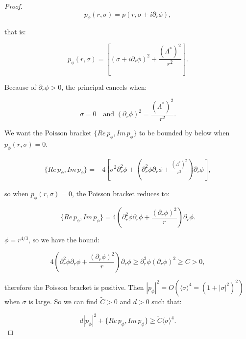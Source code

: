 \documentclass[leqno,11pt,letterpaper, english]{amsart}
\theoremstyle{plain}
\theoremstyle{definition}
\numberwithin{equation}{section}
\begin{document}
\begin{proof}
		\begin{equation}
			p_{\phi}(r,\sigma)=p(r,\sigma +i\partial_r \phi),
		\end{equation}
		
		that is:
		
		\begin{equation}
			p_{\phi}(r,\sigma)= \left[(\sigma+i\partial_r\phi)^2+\frac{(\Lambda^*)^2}{r^2}\right].
		\end{equation} 
		
		Because of $\partial_r\phi>0$, the principal cancels when: 
		
		\begin{equation}
			 \sigma=0 \quad \mbox{and } (\partial_r\phi)^2=\frac{(\Lambda^*)^2}{r^2}.
		\end{equation}
		
		We want the Poisson bracket $\{Re\, p_{\phi}, Im\, p_{\phi}\}$ to be bounded by below when $p_{\phi}(r,\sigma)=0$.
		
		\begin{align}
			\{Re\, p_{\phi}, Im\, p_{\phi}\}=& 4\left[\sigma^2\partial_r^2\phi +\left(\partial_r^2 \phi \partial_r \phi +\frac{(\Lambda^*)^2}{r^3} \right)\partial_r \phi \right],
		\end{align}
		
		so when $p_{\phi}(r,\sigma)=0$, the Poisson bracket reduces to:
		
		\begin{equation}
			\{Re\, p_{\phi}, Im\, p_{\phi}\}= 4\left(\partial_r^2 \phi \partial_r \phi +\frac{(\partial_r \phi)^2}{r} \right)\partial_r \phi.
		\end{equation}
		
		 $\phi= r^{4/3}$, so we have the bound:
		
		\begin{equation}
			4\left(\partial_r^2 \phi \partial_r \phi +\frac{(\partial_r \phi)^2}{r} \right)\partial_r \phi \geq \partial_r^2 \phi (\partial_r \phi)^2 \geq C>0,
		\end{equation}
		
		therefore the Poisson bracket is positive.
		Then $|p_{\phi}|^2 =O( \langle \sigma \rangle^4=(1+|\sigma|^2)^2)$ when $\sigma$ is large. So we can find $\tilde{C}>0$ and $d>0$ such that:
		
		\begin{equation}
			d|p_{\phi}|^2+ \{Re\, p_{\phi}, Im\, p_{\phi}\} \geq  \tilde{C}\langle \sigma \rangle^4.
		\end{equation}
		

\end{proof}
\end{document}
